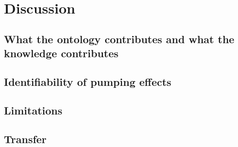 \section{Discussion}

\subsection{What the ontology contributes and what the knowledge contributes}

\subsection{Identifiability of pumping effects}

\subsection{Limitations}

\subsection{Transfer}
